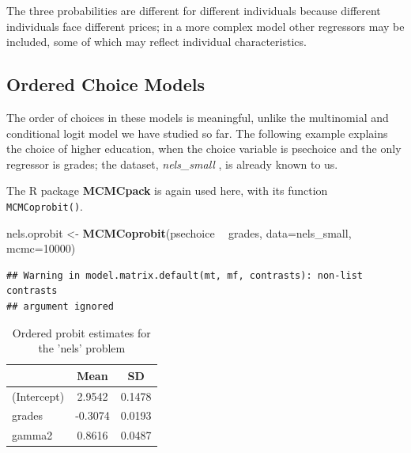 \documentclass[]{book}
\newenvironment{Shaded}{\begin{snugshade}}{\end{snugshade}}
\newcommand{\DataTypeTok}[1]{\textcolor[rgb]{0.13,0.29,0.53}{#1}}
\newcommand{\DecValTok}[1]{\textcolor[rgb]{0.00,0.00,0.81}{#1}}
\newcommand{\KeywordTok}[1]{\textcolor[rgb]{0.13,0.29,0.53}{\textbf{#1}}}
\newcommand{\NormalTok}[1]{#1}
\newcommand{\OperatorTok}[1]{\textcolor[rgb]{0.81,0.36,0.00}{\textbf{#1}}}
\newcommand{\StringTok}[1]{\textcolor[rgb]{0.31,0.60,0.02}{#1}}
\begin{document}
The three probabilities are different for different individuals because different individuals face different prices; in a more complex model other regressors may be included, some of which may reflect individual characteristics.

\hypertarget{ordered-choice-models}{%
\subsection{Ordered Choice Models}\label{ordered-choice-models}}

The order of choices in these models is meaningful, unlike the multinomial and conditional logit model we have studied so far. The following example explains the choice of higher education, when the choice variable is psechoice and the only regressor is grades; the dataset, \emph{nels\_small} , is already known to us.

The R package \textbf{MCMCpack} is again used here, with its function \texttt{MCMCoprobit()}.

\begin{Shaded}
\begin{Highlighting}[]
\NormalTok{nels.oprobit <-}\StringTok{ }\KeywordTok{MCMCoprobit}\NormalTok{(psechoice }\OperatorTok{~}\StringTok{ }\NormalTok{grades, }
                            \DataTypeTok{data=}\NormalTok{nels_small, }\DataTypeTok{mcmc=}\DecValTok{10000}\NormalTok{)}
\end{Highlighting}
\end{Shaded}

\begin{verbatim}
## Warning in model.matrix.default(mt, mf, contrasts): non-list contrasts
## argument ignored
\end{verbatim}

\begin{Shaded}
\end{Shaded}

\begin{table}[t]

\caption{\label{tab:unnamed-chunk-161}Ordered probit estimates for the 'nels' problem}
\centering
\begin{tabular}{l|c|c}
\hline
  & Mean & SD\\
\hline
(Intercept) & 2.9542 & 0.1478\\
\hline
grades & -0.3074 & 0.0193\\
\hline
gamma2 & 0.8616 & 0.0487\\
\hline
\end{tabular}
\end{table}
\end{document}
